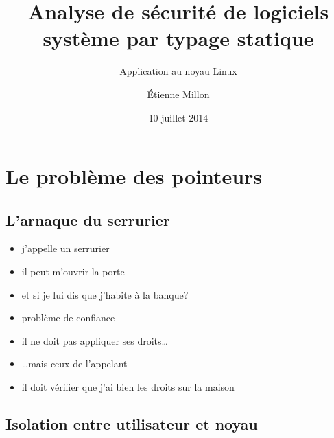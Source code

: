 \documentclass{beamer}
\title{Analyse de sécurité de logiciels système par typage statique}
\subtitle{Application au noyau Linux}
\author{Étienne Millon}
\date{10 juillet 2014}
\begin{document}

\frame{\titlepage}

\frame{\tableofcontents}

\section{Le problème des pointeurs}

\subsection{L'arnaque du serrurier}

\begin{frame}

\begin{itemize}
\item
  j'appelle un serrurier
\item
  il peut m'ouvrir la porte
\item
  et si je lui dis que j'habite à la banque?
\end{itemize}

\end{frame}
\begin{frame}

\begin{itemize}
\item problème de confiance
\item il ne doit pas appliquer ses droits…
\item …mais ceux de l'appelant
\item il doit vérifier que j'ai bien les droits sur la maison
\end{itemize}

\end{frame}

\subsection{Isolation entre utilisateur et noyau}

%
\newcommand{\mzone}[3]{
  \path[#3] (#1,0) rectangle (#2,1);
}
\end{document}
